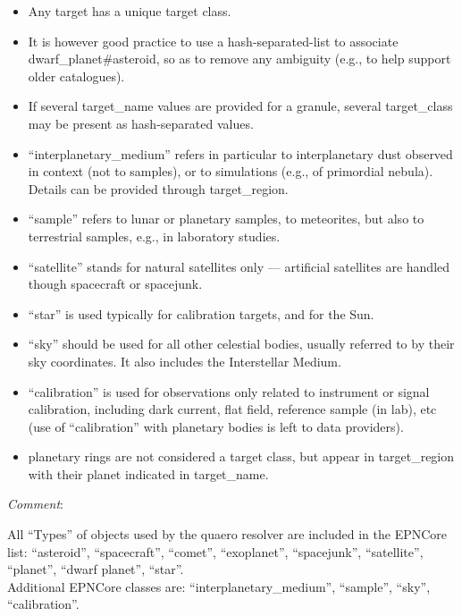 \documentclass[11pt,a4paper]{ivoa}
\begin{document}
\begin{itemize}

\item Any target has a unique target class.

\item It is however good practice to use a hash-separated-list to
associate dwarf\_planet\#asteroid, so as to remove any ambiguity
(e.g., to help support older catalogues).

\item If several target\_name values are provided for a granule, 
several target\_class may be present as hash-separated values.

\item ``interplanetary\_medium'' refers in particular to interplanetary
dust observed in context (not to samples), or to simulations
(e.g., of primordial nebula).
Details can be provided through target\_region.

\item ``sample'' refers to lunar or planetary samples, to meteorites,
but also to terrestrial samples, e.g., in laboratory studies.

\item ``satellite'' stands for natural satellites only --- artificial
satellites are handled though spacecraft or spacejunk.

\item ``star'' is used typically for calibration targets, and for the Sun.

\item ``sky'' should be used for all other celestial bodies,
usually referred to by their sky coordinates.
It also includes the Interstellar Medium.

\item ``calibration'' is used for observations only related to instrument
or signal calibration, including dark current, flat field, reference
sample (in lab), etc (use of ``calibration'' with planetary bodies is
left to data providers).

\item planetary rings are not considered a target class, but appear in
target\_region with their planet indicated in target\_name.

\end{itemize}

\emph{Comment}:

All ``Types'' of objects used by the quaero resolver are included
in the EPNCore list: ``asteroid'', ``spacecraft'', ``comet'',
``exoplanet'', ``spacejunk'', ``satellite'', ``planet'', ``dwarf planet'',
``star''.\\Additional EPNCore classes are: ``interplanetary\_medium'',
``sample'', ``sky'', ``calibration''.
\end{document}
